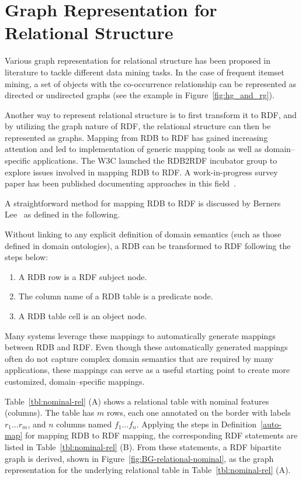 \section{Graph Representation for Relational Structure}
\label{sec:graph-rep-for-rdb}
Various graph representation for relational structure has been proposed in literature to tackle different data mining tasks. In the case of frequent itemset mining, a set of objects with the co-occurrence relationship can be represented as directed or undirected graphs (see the example in Figure~\ref{fig:hg_and_rg}).

Another way to represent relational structure is to first transform it to RDF, and by utilizing the graph nature of RDF, the relational structure can then be represented as graphs. Mapping from RDB to RDF has gained increasing attention and led to implementation of generic mapping tools as well as domain--specific applications.  The W3C launched the RDB2RDF incubator group to explore issues involved in mapping RDB to RDF. A work-in-progress survey paper has been published documenting approaches in this field~\cite{RDB2RDF}.

A straightforward method for mapping RDB to RDF is discussed by Berners Lee~\cite{TBL98} as defined in the following.

\begin{mydef}
Without linking to any explicit definition of domain semantics (such as those defined in domain ontologies), a RDB can be transformed to RDF following the steps below:
\begin{enumerate}
\label{auto-map}
\item A RDB row is a RDF subject node.
\item The column name of a RDB table is a predicate node.
\item A RDB table cell is an object node.
\end{enumerate}
\end{mydef}

Many systems leverage these mappings to automatically generate mappings between RDB and RDF. Even though these automatically generated mappings often do not capture complex domain semantics that are required by many applications, these mappings can serve as a useful starting point to create more customized, domain--specific mappings.

\begin{myexp}
Table~\ref{tbl:nominal-rel} (A) shows a relational table with nominal features (columns). The table has $m$ rows, each one annotated on the border with labels $r_1 \ldots r_m$, and $n$ columns named $f_1 \ldots f_n$. Applying the steps in Definition~\ref{auto-map} for mapping RDB to RDF mapping, the corresponding RDF statements are listed in Table~\ref{tbl:nominal-rel} (B). From these statements, a RDF bipartite graph is derived, shown in Figure~\ref{fig:BG-relational-nominal}, as the graph representation for the underlying relational table in Table~\ref{tbl:nominal-rel} (A).
\end{myexp}

